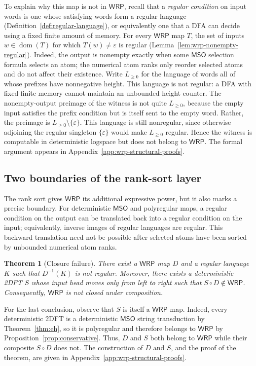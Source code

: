 \documentclass[11pt]{article}
\newtheorem{theorem}{Theorem}[section]
\theoremstyle{definition}
\newcommand{\WRP}{\mathsf{WRP}}
\newcommand{\MSO}{\mathsf{MSO}}
\begin{document}
To explain why this map is not in $\WRP$, recall that a \emph{regular
condition} on input words is one whose satisfying words form a regular
language (Definition~\ref{def:regular-language}), or equivalently one that a
DFA can decide using a fixed finite amount of memory.  For every $\WRP$ map
$T$, the set of inputs $w\in\operatorname{dom}(T)$ for which
$T(w)\ne\varepsilon$ is regular (Lemma~\ref{lem:wrp-nonempty-regular}).
Indeed, the output is nonempty exactly when some $\MSO$ selection formula
selects an atom; the numerical atom ranks only reorder selected atoms and do not
affect their existence.  Write $L_{\ge 0}$ for the language of words all of
whose prefixes have nonnegative height.  This language is not regular: a DFA
with fixed finite memory cannot maintain an unbounded height counter.  The
nonempty-output preimage of the witness is not quite $L_{\ge 0}$, because the
empty input satisfies the prefix condition but is itself sent to the empty
word.  Rather, the preimage is $L_{\ge 0}\setminus\{\varepsilon\}$.  This
language is still nonregular, since otherwise adjoining the regular singleton
$\{\varepsilon\}$ would make $L_{\ge 0}$ regular.  Hence the witness is
computable in deterministic logspace but does not belong to $\WRP$.  The
formal argument appears in
Appendix~\ref{app:wrp-structural-proofs}.

\subsection{Two boundaries of the rank-sort layer}
\label{sec:wrp-boundaries}

The rank sort gives $\WRP$ its additional expressive power, but it also marks
a precise boundary.  For deterministic $\MSO$ and polyregular maps, a regular
condition on the output can be translated back into a regular condition on the
input; equivalently, inverse images of regular languages are regular.  This
backward translation need not be possible after selected atoms have been sorted
by unbounded numerical atom ranks.

\begin{theorem}[Closure failure]
\label{thm:wrp-not-closed}
There exist a $\WRP$ map $D$ and a regular language $K$ such
that $D^{-1}(K)$ is not regular.  Moreover, there exists a deterministic
2DFT $S$ whose input head moves only from left to right such that
$S\circ D\notin\WRP$.  Consequently, $\WRP$ is not closed under composition.
\end{theorem}

For the last conclusion, observe that $S$ is itself a $\WRP$ map.  Indeed,
every deterministic 2DFT is a deterministic $\MSO$ string transduction by
Theorem~\ref{thm:eh}, so it is polyregular and therefore belongs to $\WRP$ by
Proposition~\ref{prop:conservative}.  Thus, $D$ and $S$ both belong to $\WRP$
while their composite $S\circ D$ does not.
The construction of $D$ and $S$, and the proof of the theorem, are given in
Appendix~\ref{app:wrp-structural-proofs}.
\end{document}
